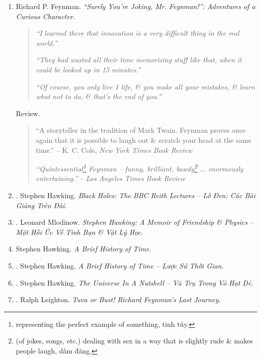 \documentclass{article}
\begin{document}
\begin{enumerate}
	\item {\sc Richard P. Feynman}. {\it``Surely You're Joking, Mr. Feynman!'': Adventures of a Curious Character}.
	\begin{quotation}
		{\it``I learned there that innovation is a very difficult thing in the real world.''}

		{\it``They had wasted all their time memorizing stuff like that, when it could be looked up in 15 minutes.''}

		{\it``Of course, you only live 1 life, \& you make all your mistakes, \& learn what not to do, \& that's the end of you.''}
	\end{quotation}
	{\sf Review.}
	\begin{quotation}
		``A storyteller in the tradition of {\sc Mark Twain}. {\sf Feynman} proves once again that it is possible to laugh out \& scratch your head at the same time.'' -- K. C. Cole, {\it New York Times Book Review}

		{\it``Quintessential\footnote{representing the perfect example of something, tinh túy.} Feynman -- funny, brilliant, bawdy\footnote{(of jokes, songs, etc.) dealing with sex in a way that is slightly rude \& makes people laugh, dâm đãng.} $\ldots$ enormously entertaining.''} -- {\it Los Angeles Times Book Review}
	\end{quotation}

	\item \cite{Hawking_bbc}. Stephen Hawking. {\it Black Holes: The BBC Reith Lectures -- Lỗ Đen: Các Bài Giảng Trên Đài}.\hfill{\sf[done]}

    \item \cite{Mlodinow_Hawking_memoir}. {\sc Leonard Mlodinow}. {\it Stephen Hawking: A Memoir of Friendship \& Physics -- Một Hồi Ức Về Tình Bạn \& Vật Lý Học}.\hfill{\sf[done]}

	\item {\sc Stephen Hawking}. {\it A Brief History of Time}. {}

	\item \cite{Hawking_lstg}. {\sc Stephen Hawking}. {\it A Brief History of Time -- Lược Sử Thời Gian}.\hfill{\sf[done]}

	\item \cite{Hawking_vttvhd}. {\sc Stephen Hawking}. {\it The Universe In A Nutshell -- Vũ Trụ Trong Vỏ Hạt Dẻ}.\hfill{\sf[done]}

	\item \cite{Leighton_Feyman_last_journey}. {\sc Ralph Leighton}. {\it Tuva or Bust! Richard Feynman's Last Journey}.


\end{enumerate}
\end{document}
